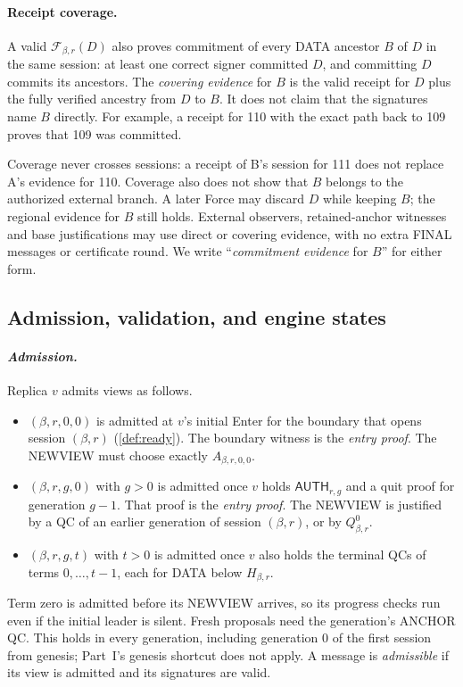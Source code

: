 \documentclass[11pt,a4paper]{article}
\newcommand{\FC}{\mathcal F}
\newcommand{\tagg}[1]{\ensuremath{\mathsf{#1}}}
\newcommand{\defterm}[1]{\textcolor{rrBlue}{\textit{#1}}}
\begin{document}
\paragraph{Receipt coverage.}
\label{sec:coverage}
A valid $\FC_{\beta,r}(D)$ also proves commitment of every DATA ancestor
$B$ of $D$ in the same session: at least one correct signer committed
$D$, and committing $D$ commits its ancestors. The \defterm{covering
evidence} for $B$ is the valid receipt for $D$ plus the fully verified
ancestry from $D$ to $B$. It does not claim that the signatures name $B$
directly. For example, a receipt for 110 with the exact path back to 109
proves that 109 was committed.

Coverage never crosses sessions: a receipt of B's session for 111 does
not replace A's evidence for 110. Coverage also does not show that $B$
belongs to the authorized external branch. A later Force may discard $D$
while keeping $B$; the regional evidence for $B$ still holds. External
observers, retained-anchor witnesses and base justifications may use
direct or covering evidence, with no extra FINAL messages or certificate
round. We write ``\defterm{commitment evidence} for $B$'' for either form.

\subsection{Admission, validation, and engine states}
\label{sec:admission}
\paragraph{\defterm{Admission.}}
Replica $v$ admits views as follows.
\begin{itemize}
\item $(\beta,r,0,0)$ is admitted at $v$'s initial Enter for the boundary
that opens session $(\beta,r)$ (\cref{def:ready}). The boundary witness is
the \defterm{entry proof}. The NEWVIEW must choose exactly
$A_{\beta,r,0,0}$.
\item $(\beta,r,g,0)$ with $g>0$ is admitted once $v$ holds
$\tagg{AUTH}_{r,g}$ and a quit proof for generation $g-1$. That proof is
the \defterm{entry proof}. The NEWVIEW is justified by a QC of an earlier
generation of session $(\beta,r)$, or by $Q_{\beta,r}^0$.
\item $(\beta,r,g,t)$ with $t>0$ is admitted once $v$ also holds the
terminal QCs of terms $0,\ldots,t-1$, each for DATA below $H_{\beta,r}$.
\end{itemize}
Term zero is admitted before its NEWVIEW arrives, so its progress checks
run even if the initial leader is silent. Fresh proposals need the
generation's ANCHOR QC. This holds in every generation, including
generation $0$ of the first session from genesis; Part~I's genesis
shortcut does not apply. A message is \defterm{admissible} if its view is
admitted and its signatures are valid.
\end{document}
